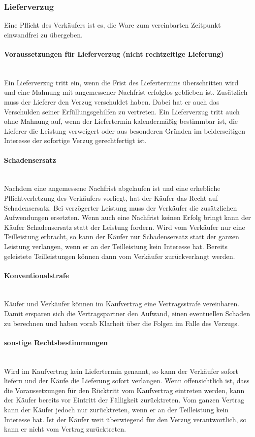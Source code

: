 \subsubsection{Lieferverzug}
Eine Pflicht des Verkäufers ist es, die Ware zum vereinbarten Zeitpunkt einwandfrei zu übergeben.

\paragraph{Voraussetzungen für Lieferverzug (nicht rechtzeitige Lieferung)}~\\
Ein Lieferverzug tritt ein, wenn die Frist des Liefertermins überschritten wird und eine Mahnung mit angemessener Nachfrist erfolglos geblieben ist. Zusätzlich muss der Lieferer den Verzug verschuldet haben. Dabei hat er auch das Verschulden seiner Erfüllungsgehilfen zu vertreten. Ein Lieferverzug tritt auch ohne Mahnung auf, wenn der Liefertermin kalendermäßig bestimmbar ist, die Lieferer die Leistung verweigert oder aus besonderen Gründen im beiderseitigen Interesse der sofortige Verzug gerechtfertigt ist.

\paragraph{Schadensersatz}~\\
Nachdem eine angemessene Nachfrist abgelaufen ist und eine erhebliche Pflichtverletzung des Verkäufers vorliegt, hat der Käufer das Recht auf Schadensersatz. Bei verzögerter Leistung muss der Verkäufer die zusätzlichen Aufwendungen ersetzten. Wenn auch eine Nachfrist keinen Erfolg bringt kann der Käufer Schadensersatz statt der Leistung fordern. Wird vom Verkäufer nur eine Teilleistung erbracht, so kann der Käufer nur Schadensersatz statt der ganzen Leistung verlangen, wenn er an der Teilleistung kein Interesse hat. Bereits geleistete Teilleistungen können dann vom Verkäufer zurückverlangt werden.

\paragraph{Konventionalstrafe}~\\
Käufer und Verkäufer können im Kaufvertrag eine Vertragsstrafe vereinbaren. Damit ersparen sich die Vertragspartner den Aufwand, einen eventuellen Schaden zu berechnen und haben vorab Klarheit über die Folgen im Falle des Verzugs.

\paragraph{sonstige Rechtsbestimmungen}~\\
Wird im Kaufvertrag kein Liefertermin genannt, so kann der Verkäufer sofort liefern und der Käufe die Lieferung sofort verlangen. Wenn offensichtlich ist, dass die Voraussetzungen für den Rücktritt vom Kaufvertrag eintreten werden, kann der Käufer bereits vor Eintritt der Fälligkeit zurücktreten. Vom ganzen Vertrag kann der Käufer jedoch nur zurücktreten, wenn er an der Teilleistung kein Interesse hat. Ist der Käufer weit überwiegend für den Verzug verantwortlich, so kann er nicht vom Vertrag zurücktreten.
	
